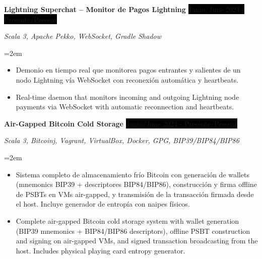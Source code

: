 \documentclass[paper=a4,fontsize=11pt]{scrartcl} %
\newcommand{\sepspace}{\vspace*{1em}}		%
\newcommand{\ProjectEntry}[4]{				  %
		\noindent \textbf{#1} \hfill      %
		\noindent\colorbox{Black}{\color{White}#2} \par  %
		\noindent \textit{#3} \par              %
		\noindent\hangindent=2em\hangafter=0 \small #4 %
		\normalsize \par}
\begin{document}
\ProjectEntry{Lightning Superchat -- Monitor de Pagos Lightning}{Junio/June 2024 - Presente/Present}{Scala 3, Apache Pekko, WebSocket, Gradle Shadow}{
\begin{itemize}
\item{Demonio en tiempo real que monitorea pagos entrantes y salientes de un nodo Lightning vía WebSocket con reconexión automática y heartbeats.}
\item{Real-time daemon that monitors incoming and outgoing Lightning node payments via WebSocket with automatic reconnection and heartbeats.}
\end{itemize}
}
\sepspace

\ProjectEntry{Air-Gapped Bitcoin Cold Storage}{Junio/June 2024 - Presente/Present}{Scala 3, Bitcoinj, Vagrant, VirtualBox, Docker, GPG, BIP39/BIP84/BIP86}{
\begin{itemize}
\item{Sistema completo de almacenamiento frío Bitcoin con generación de wallets (mnemonics BIP39 + descriptores BIP84/BIP86), construcción y firma offline de PSBTs en VMs air-gapped, y transmisión de la transacción firmada desde el host. Incluye generador de entropía con naipes físicos.}
\item{Complete air-gapped Bitcoin cold storage system with wallet generation (BIP39 mnemonics + BIP84/BIP86 descriptors), offline PSBT construction and signing on air-gapped VMs, and signed transaction broadcasting from the host. Includes physical playing card entropy generator.}
\end{itemize}
}
\sepspace
\end{document}
